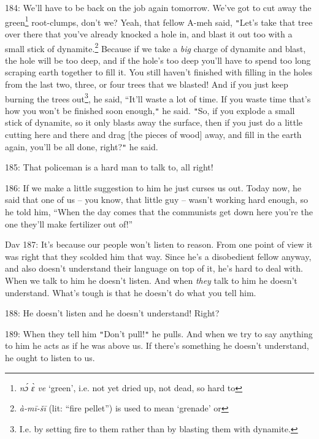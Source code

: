 184: We'll have to be back on the job again tomorrow. We've got to cut away the
green\footnote{\textit{nɔ́ ɛ̀ ve} `green', i.e. not yet dried up, not dead, so hard to} root-clumps, don't we? Yeah, that fellow A-meh said, \texttt{"}Let's
take that tree over there that you've already knocked a hole in, and blast it out
too with a small stick of dynamite.\footnote{\textit{à-mī-šī } (lit: ``fire pellet'') is used to mean `grenade' or} Because if we take a \textit{big} charge
of dynamite and blast, the hole will be too deep, and if the hole's too deep you'll
have to spend too long scraping earth together to fill it. You still haven't finished
with filling in the holes from the last two, three, or four trees that we blasted!
And if you just keep burning the trees out\footnote{I.e. by setting fire to them rather than by blasting them with dynamite.}, he said, ``It'll waste a lot of
time. If you waste time that's how you won't be finished soon enough,\texttt{"}
he said. \texttt{"}So, if you explode a small stick of dynamite, so it only blasts
away the surface, then if you just do a little cutting here and there and drag
[the pieces of wood] away, and fill in the earth again, you'll be all done, right?\texttt{"}
he said.

185: That policeman is a hard man to talk to, all right!

186: If we make a little suggestion to him he just curses us out. Today now, he
said that one of us -- you know, that little guy -- wasn't working hard enough,
so he told him, ``When the day comes that the communists get down here you're the
one they'll make fertilizer out of!''

Dav 187: It's because our people won't listen to reason. From one point of view
it was right that they scolded him that way. Since he's a disobedient fellow anyway,
and also doesn't understand their language on top of it, he's hard to deal with.
When we talk to him he doesn't listen. And when \textit{they} talk to him he doesn't
understand. What's tough is that he doesn't do what you tell him.

188: He doesn't listen and he doesn't understand! Right?

189: When they tell him \texttt{"}Don't pull!\texttt{"} he pulls. And when we try
to say anything to him he acts as if he was above us. If there's something he doesn't
understand, he ought to listen to us.

